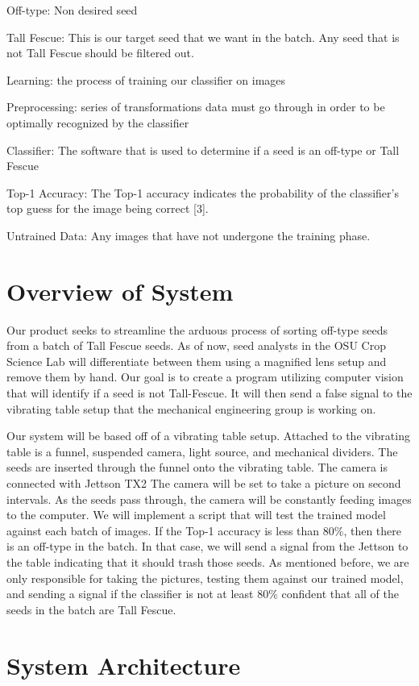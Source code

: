\documentclass[onecolumn, draftclsnofoot,10pt, compsoc]{IEEEtran}
\begin{document}
Off-type: Non desired seed

Tall Fescue: This is our target seed that we want in the batch. Any seed that is not Tall Fescue should be filtered out.

Learning: the process of training our classifier on images

Preprocessing: series of transformations data must go through in order to be optimally recognized by the classifier

Classifier: The software that is used to determine if a seed is an off-type or Tall Fescue

Top-1 Accuracy: The Top-1 accuracy indicates the probability of the classifier’s top guess for the image being correct [3]. 

Untrained Data: Any images that have not undergone the training phase.


\section{Overview of System}
Our product seeks to streamline the arduous process of sorting off-type seeds from a batch of Tall Fescue seeds. As of now, seed analysts in the OSU Crop Science Lab will differentiate between them using a magnified lens setup and remove them by hand. Our goal is to create a program utilizing computer vision that will identify if a seed is not Tall-Fescue. It will then send a false signal to the vibrating table setup that the mechanical engineering group is working on.

Our system will be based off of a vibrating table setup. Attached to the vibrating table is a funnel, suspended camera, light source, and mechanical dividers. The seeds are inserted through the funnel onto the vibrating table. The camera is connected with Jettson TX2  The camera will be set to take a picture on second intervals. As the seeds pass through, the camera will be constantly feeding images to the computer. We will implement a script that will test the trained model against each batch of images. If the Top-1 accuracy is less than 80\%, then there is an off-type in the batch. In that case, we will send a signal from the Jettson to the table indicating that it should trash those seeds. As mentioned before, we are only responsible for taking the pictures, testing them against our trained model, and sending a signal if the classifier is not at least 80\% confident that all of the seeds in the batch are Tall Fescue.

\section{System Architecture}
\end{document}
